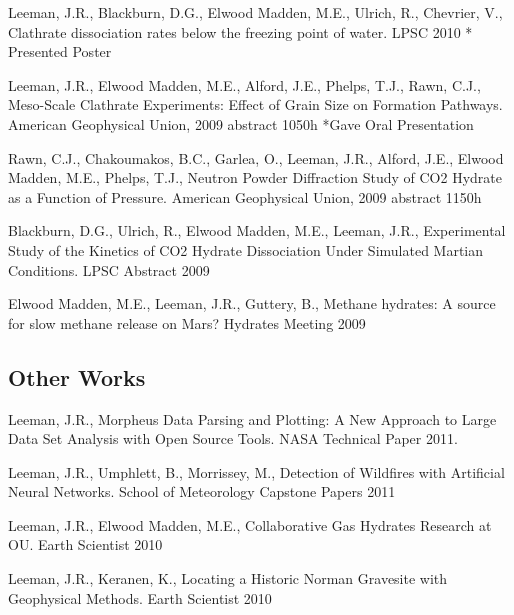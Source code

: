 \documentclass[letterpaper]{article}
\renewenvironment{itemize}{
  \begin{list}{}{
    \setlength{\leftmargin}{1.5em}
  }
}{
  \end{list}
}
\begin{document}
\begin{itemize}
\item Leeman, J.R., Blackburn, D.G., Elwood Madden, M.E., Ulrich, R., Chevrier, V., Clathrate dissociation rates below the freezing point of water. LPSC 2010 * Presented Poster

\item Leeman, J.R., Elwood Madden, M.E., Alford, J.E., Phelps, T.J., Rawn, C.J., Meso-Scale Clathrate Experiments: Effect of Grain Size on Formation Pathways. American Geophysical Union, 2009 abstract 1050h *Gave Oral Presentation

\item Rawn, C.J., Chakoumakos, B.C., Garlea, O., Leeman, J.R., Alford, J.E., Elwood Madden, M.E., Phelps, T.J., Neutron Powder Diffraction Study of CO2 Hydrate as a Function of Pressure. American Geophysical Union, 2009 abstract 1150h

\item Blackburn, D.G., Ulrich, R., Elwood Madden, M.E., Leeman, J.R., Experimental Study of the Kinetics of CO2 Hydrate Dissociation Under Simulated Martian Conditions. LPSC Abstract 2009

\item Elwood Madden, M.E., Leeman, J.R., Guttery, B., Methane hydrates: A source for slow methane release on Mars? Hydrates Meeting 2009

\end{itemize}

\subsection*{Other Works}
\begin{itemize}

\item  Leeman, J.R., Morpheus Data Parsing and Plotting: A New Approach to Large Data Set Analysis with Open Source Tools.  NASA Technical Paper 2011.

\item Leeman, J.R., Umphlett, B., Morrissey, M., Detection of Wildfires with Artificial Neural Networks.  School of Meteorology Capstone Papers 2011

\item Leeman, J.R., Elwood Madden, M.E.,  Collaborative Gas Hydrates Research at OU. Earth Scientist 2010

\item Leeman, J.R., Keranen, K., Locating a Historic Norman Gravesite with Geophysical Methods. Earth Scientist 2010

\end{itemize}
\end{document}
